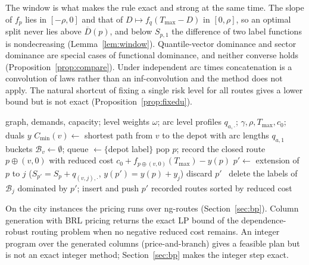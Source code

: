 \documentclass[preprint,12pt]{elsarticle}
\theoremstyle{definition}
\theoremstyle{remark}
\newcommand{\Dh}{\overline{D}}
\begin{document}
The window is what makes the rule exact and strong at the same time. The slope of $f_p$ lies in $[-\rho,0]$ and that of $D\mapsto f_q(T_{\max}-D)$ in $[0,\rho]$, so an optimal split never lies above $\Dh(p)$, and below $S_{p,1}$ the difference of two label functions is nondecreasing (Lemma~\ref{lem:window}). Quantile-vector dominance and sector dominance are special cases of functional dominance, and neither converse holds (Proposition~\ref{prop:compare}). Under independent arc times concatenation is a convolution of laws rather than an inf-convolution and the method does not apply. The natural shortcut of fixing a single risk level for all routes gives a lower bound but is not exact (Proposition~\ref{prop:fixedu}).

\begin{algorithm}[t]
\caption{BRL pricing for the dependence-robust routing problem ($H=1$)}\label{alg:brl}
\begin{algorithmic}[1]
\Require graph, demands, capacity; level weights $\omega$; arc level profiles $q_{a,\cdot}$; $\gamma,\rho,T_{\max},c_0$; duals $y$
\State $C_{\min}(v)\gets$ shortest path from $v$ to the depot with arc lengths $q_{a,1}$
\State buckets $\mathcal B_v\gets\emptyset$; queue $\gets\{$depot label$\}$
  \State pop $p$; record the closed route $p\oplus(v,0)$ with reduced cost $c_0+f_{p\oplus(v,0)}(T_{\max})-y(p)$
    \State $p'\gets$ extension of $p$ to $j$ ($S_{p'}=S_p+q_{(v,j),\cdot}$, $y(p')=y(p)+y_j$)
     discard $p'$
    \Else\ delete the labels of $\mathcal B_j$ dominated by $p'$; insert and push $p'$
    \EndIf
  \EndFor
\EndWhile
\State \Return recorded routes sorted by reduced cost
\end{algorithmic}
\end{algorithm}

On the city instances the pricing runs over ng-routes (Section~\ref{sec:bp}). Column generation \citep{Feillet2004,Irnich2005} with BRL pricing returns the exact LP bound of the dependence-robust routing problem when no negative reduced cost remains. An integer program over the generated columns (price-and-branch) gives a feasible plan but is not an exact integer method; Section~\ref{sec:bp} makes the integer step exact.
\end{document}
